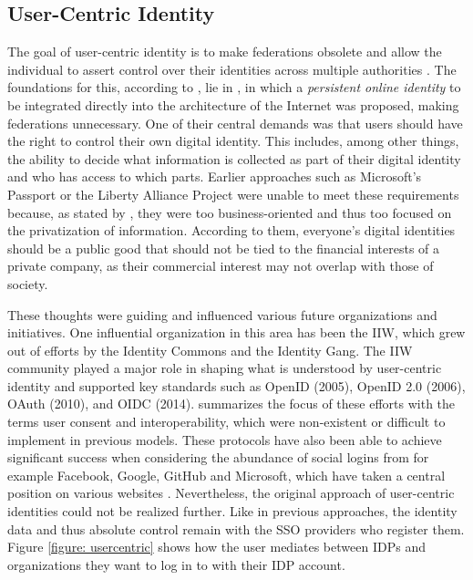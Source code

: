 	    \subsection{User-Centric Identity}\label{subsection: user centric}
	    The goal of user-centric identity is to make federations obsolete and allow the individual to assert control over their identities across multiple authorities \cite{allen_path_2016}. The foundations for this, according to \cite{allen_path_2016}, lie in \cite{jordan_augmented_2003}, in which a \textit{persistent online identity} to be integrated directly into the architecture of the Internet was proposed, making federations unnecessary. One of their central demands was that users should have the right to control their own digital identity. This includes, among other things, the ability to decide what information is collected as part of their digital identity and who has access to which parts. Earlier approaches such as Microsoft's Passport or the Liberty Alliance Project were unable to meet these requirements because, as stated by \cite{jordan_augmented_2003}, they were too business-oriented and thus too focused on the privatization of information. According to them, everyone's digital identities should be a public good that should not be tied to the financial interests of a private company, as their commercial interest may not overlap with those of society. 
	    
	    These thoughts were guiding and influenced various future organizations and initiatives. One influential organization in this area has been the \acf{IIW}, which grew out of efforts by the Identity Commons and the Identity Gang. The \ac{IIW} community played a major role in shaping what is understood by user-centric identity and supported key standards such as OpenID (2005), OpenID 2.0 (2006), OAuth (2010), and \ac{OIDC} (2014). \cite{allen_path_2016} summarizes the focus of these efforts with the terms user consent and interoperability, which were non-existent or difficult to implement in previous models. These protocols have also been able to achieve significant success when considering the abundance of social logins from for example Facebook, Google, GitHub and Microsoft, which have taken a central position on various websites \cite[p. 8]{preukschat_self-sovereign_2021}. Nevertheless, the original approach of user-centric identities could not be realized further. Like in previous approaches, the identity data and thus absolute control remain with the \ac{SSO} providers who register them. Figure \ref{figure: usercentric} shows how the user mediates between \acp{IDP} and organizations they want to log in to with their IDP account.
	    
